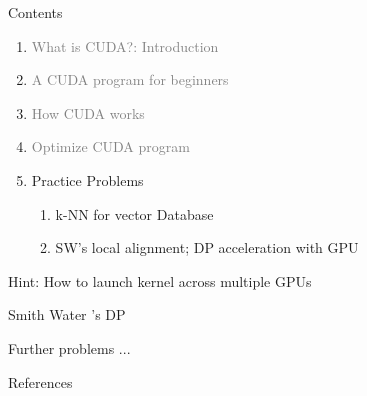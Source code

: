 \documentclass[dvipdfmx,11pt]{beamer}   %
\begin{document}
\begin{frame}{Contents}
  \begin{enumerate}[<+->]   %
    \item \textcolor{gray}{What is CUDA?: Introduction}
    \item \textcolor{gray}{A CUDA program for beginners}
    \item \textcolor{gray}{How CUDA works}
    \item \textcolor{gray}{Optimize CUDA program}
    \item Practice Problems
    \begin{enumerate}
      \item k-NN for vector Database
      \item SW's local alignment; DP acceleration with GPU
    \end{enumerate}
  \end{enumerate}
\end{frame}
\begin{frame}{Hint: How to launch kernel across multiple GPUs}

\end{frame}
\begin{frame}{Smith Water 's DP}

\end{frame}
\begin{frame}{Further problems ...}

\end{frame}
\begin{frame}{References}

\end{frame}
\end{document}
